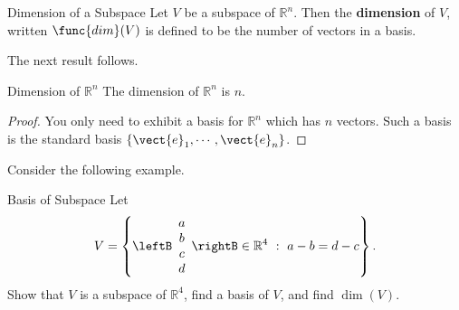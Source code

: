 \begin{definition}{Dimension of a Subspace}\label{def:dimension}
Let $V$ be a subspace of $\mathbb{R}^{n}$. Then the \textbf{dimension }of $V$, written $\func{dim}(V)$
is defined to be the number of vectors in a basis.  
\end{definition}

The next result follows.

\begin{corollary}{Dimension of $\mathbb{R}^n$}\label{cor:dimensionRn}
The dimension of $\mathbb{R}^{n}$ is $n.$ 
\end{corollary}

\begin{proof}
You only need to exhibit a basis for $\mathbb{R}^{n}$ which
has $n$ vectors. Such a basis is the standard basis $\left\{ \vect{e}_{1},\cdots , \vect{e}_{n}\right\} $.
\end{proof}

Consider the following example.

\begin{example}{Basis of Subspace}\label{exa:basissubspace}
Let 
\[ V=\left\{
\leftB\begin{array}{c} a\\ b\\ c\\ d\end{array}\rightB\in\mathbb{R}^4
~:~ a-b=d-c \right\}.\]
Show that $V$ is a subspace of $\mathbb{R}^4$,
find a basis of $V$, and find $\dim(V)$.
\end{example}

